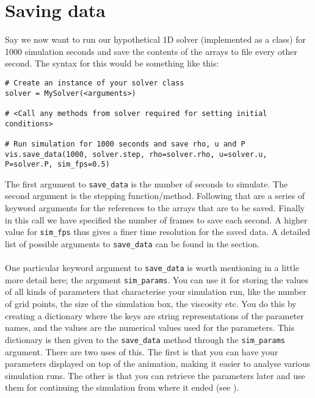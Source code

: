 \documentclass{article}
\newcommand{\ttt}[1]{\texttt{#1}}
\begin{document}
\section{Saving data}
\label{sec:save}
Say we now want to run our hypothetical 1D solver (implemented as a class) for 1000 simulation seconds and save the contents of the arrays to file every other second. The syntax for this would be something like this:\\
\begin{minipage}{\linewidth}
\begin{lstlisting}
# Create an instance of your solver class
solver = MySolver(<arguments>)

# <Call any methods from solver required for setting initial conditions>

# Run simulation for 1000 seconds and save rho, u and P
vis.save_data(1000, solver.step, rho=solver.rho, u=solver.u, P=solver.P, sim_fps=0.5)
\end{lstlisting}
\end{minipage}
The first argument to \ttt{save\_data} is the number of seconds to simulate. The second argument is the stepping function/method. Following that are a series of keyword arguments for the references to the arrays that are to be saved. Finally in this call we have specified the number of frames to save each second. A higher value for \ttt{sim\_fps} thus gives a finer time resolution for the saved data. A detailed list of possible arguments to \ttt{save\_data} can be found in the  section.\\\\
One particular keyword argument to \ttt{save\_data} is worth mentioning in a little more detail here; the argument \ttt{sim\_params}. You can use it for storing the values of all kinds of parameters that characterise your simulation run, like the number of grid points, the size of the simulation box, the viscosity etc. You do this by creating a dictionary where the keys are string representations of the parameter names, and the values are the numerical values used for the parameters. This dictionary is then given to the \ttt{save\_data} method through the \ttt{sim\_params} argument. There are two uses of this. The first is that you can have your parameters displayed on top of the animation, making it easier to analyse various simulation runs. The other is that you can retrieve the parameters later and use them for continuing the simulation from where it ended (see ). \\\\
\end{document}
